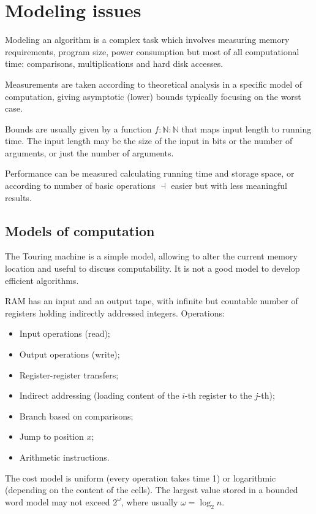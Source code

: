 \section{Modeling issues}
Modeling an algorithm is a complex task which involves measuring memory requirements, program size, power consumption but most of all computational time: comparisons, multiplications and hard disk accesses.

Measurements are taken according to theoretical analysis in a specific model of computation, giving asymptotic (lower) bounds typically focusing on the worst case. 

Bounds are usually given by a function $f : \mathbb{N} : \mathbb{N}$ that maps input length to running time. The input length may be the size of the input in bits or the number of arguments, or just the number of arguments.

Performance can be measured calculating running time and storage space, or according to number of basic operations $\dashv$ easier but with less meaningful results.

\subsection{Models of computation}
The Touring machine is a simple model, allowing to alter the current memory location and useful to discuss computability. It is not a good model to develop efficient algorithms.

RAM has an input and an output tape, with infinite but countable number of registers holding indirectly addressed integers. Operations:
\begin{itemize}
	\item Input operations (read);
	\item Output operations (write);
	\item Register-register transfers;
	\item Indirect addressing (loading content of the $i$-th register to the $j$-th);
	\item Branch based on comparisons;
	\item Jump to position $x$;
	\item Arithmetic instructions.
\end{itemize}
The cost model is uniform (every operation takes time 1) or logarithmic (depending on the content of the cells). The largest value stored in a bounded word model may not exceed $2^\omega$, where usually $\omega = \log_2 n$.

